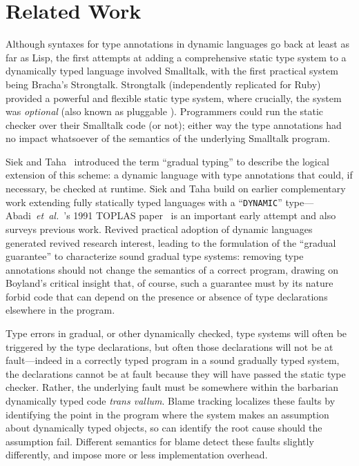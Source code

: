 
\section{Related Work}
\label{sec:related-work}

Although syntaxes for type annotations in dynamic languages go back at
least as far as Lisp\citep{cltl2}, the first attempts at adding a
comprehensive static type system to a dynamically typed
language involved 
Smalltalk\citep{RalphJohnson1986}, with the first practical system
being Bracha's Strongtalk\citep{strongtalk}. Strongtalk
(independently replicated for Ruby\citep{DBRuby09}) provided a
powerful and flexible static type system, where crucially, the system
was \emph{optional} (also known as pluggable
\cite{GiladPluggable2004}). Programmers could run the static checker
over their Smalltalk code (or not); either way the type annotations
had no impact whatsoever of the semantics of the underlying Smalltalk
program.

Siek and Taha~\cite{Siek2006} introduced the term ``gradual typing''
 to describe the logical extension of this scheme: a
dynamic language with type annotations that could, if necessary, be
checked at runtime. Siek and Taha build on earlier complementary work extending fully statically typed languages with a ``\texttt{DYNAMIC}''
type---Abadi~\textit{et~al.}~'s 1991 TOPLAS paper~\cite{AbadiTOPLAS1991} is an
important early attempt
and also surveys previous work. Revived practical adoption of dynamic
languages generated revived research interest, leading to the
formulation of the ``gradual guarantee''\citep{Siek2006,Siek2015} to characterize sound
gradual type systems: removing type annotations should not change the
semantics of a correct program, drawing on Boyland's critical
insight that, of course, such a guarantee must by its nature forbid
code that can depend on the presence or absence of type declarations 
elsewhere in the program\citep{Boyland2014}. 

Type errors in gradual, or other dynamically checked, type systems will
often be triggered by the type declarations, but often those
declarations will not be at fault---indeed in a correctly typed
program in a sound gradually typed system,  the declarations cannot be
at fault because they will have passed the static type
checker. Rather, the underlying fault must be somewhere within the
barbarian dynamically typed code \emph{trans vallum}.
Blame tracking\citep{blame2009,blameThreesomes2010,blameForAll2011} localizes these
faults by identifying 
the point in the program where the system makes an 
assumption about dynamically typed objects, so can identify the root
cause should the assumption fail.  Different semantics for blame
detect these faults slightly differently, and impose more or less
implementation overhead\citep{reticPython2014,monotonic2015,Vitousek2017}.

